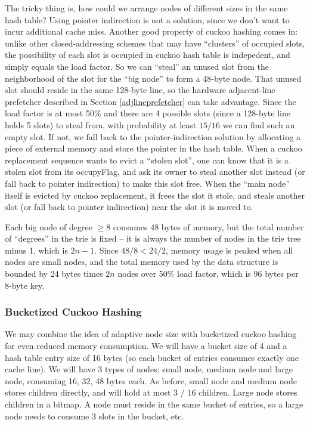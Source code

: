 \documentclass[11pt, usletter]{article}
\begin{document}
The tricky thing is, how could we arrange nodes of different sizes in the same hash table?
Using pointer indirection is not a solution, since we don't want to incur additional cache miss. 
Another good property of cuckoo hashing comes in: 
unlike other closed-addressing schemes that may have ``clusters'' of occupied slots, 
the possibility of each slot is occupied in cuckoo hash table is indepedent, 
and simply equals the load factor. 
So we can ``steal'' an unused slot from the neighborhood of the slot for the ``big node'' to form a 48-byte node. 
That unused slot should reside in the same 128-byte line,
so the hardware adjacent-line prefetcher described in Section \ref{adjlineprefetcher} can take advantage.
Since the load factor is at most 50\% and there are 4 possible slots (since a 128-byte line holds 5 slots) to steal from, 
with probability at least $15/16$ we can find such an empty slot. If not, we fall back to the pointer-indirection solution
by allocating a piece of external memory and store the pointer in the hash table. 
When a cuckoo replacement sequence wants to evict a ``stolen slot'', one can know that it is a stolen slot 
from its occupyFlag, and ask its owner to steal another slot instead (or fall back to pointer indirection) to make this slot free.  
When the ``main node'' itself is evicted by cuckoo replacement, it frees the slot it stole, 
and steals another slot (or fall back to pointer indirection) near the slot it is moved to.
 
Each big node of degree $\geq 8$ consumes 48 bytes of memory, but the total number of ``degrees'' in the trie is fixed 
-- it is always the number of nodes in the trie tree minus 1, which is $2n-1$. 
Since $48/8<24/2$, memory usage is peaked when all nodes are small nodes, 
and the total memory used by the data structure is bounded by 24 bytes times $2n$ nodes over 50\% load factor, 
which is 96 bytes per 8-byte key.

\subsubsection*{Bucketized Cuckoo Hashing}  \label{variantsizehash}

We may combine the idea of adaptive node size with bucketized cuckoo hashing for even reduced memory consumption. 
We will have a bucket size of 4 and a hash table entry size of 16 bytes (so each bucket of entries consumes exactly one cache line).
We will have 3 types of nodes: small node, medium node and large node, consuming 16, 32, 48 bytes each. 
As before, small node and medium node stores children directly, and will hold at most 3 / 16 children. 
Large node stores children in a bitmap. A node must reside in the same bucket of entries, 
so a large node needs to consume 3 slots in the bucket, etc.
\end{document}
